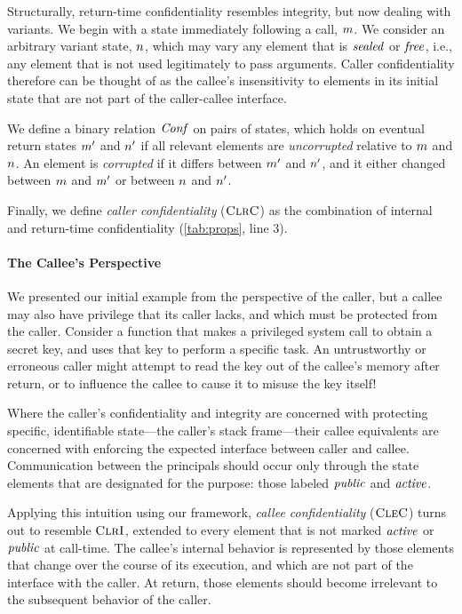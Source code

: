 \documentclass[10pt,conference]{ieeetran}%
\theoremstyle{definition}
\begin{document}
Structurally, return-time confidentiality resembles integrity, but now dealing with
variants. We begin with a state immediately following
a call, \(m\). We consider an arbitrary variant state,
\(n\), which may vary any element that is \(\mathit{sealed}\) or \(\mathit{free}\),
i.e., any element that is not used legitimately to pass arguments. Caller confidentiality
therefore can be thought of as the callee's insensitivity to elements in its initial state
that are not part of the caller-callee interface.

We define a binary relation \(\mathit{Conf}\) on pairs of states,
which holds on eventual return states \(m'\) and \(n'\)
if all relevant elements are {\em uncorrupted} relative to \(m\) and \(n\).
An element is {\em corrupted} if it differs between \(m'\) and \(n'\),
and it either changed between \(m\) and \(m'\) or between \(n\) and \(n'\).

Finally, we define \emph{caller confidentiality} (\(\textnormal{\sc ClrC}\)) as the
combination of internal and return-time confidentiality (\cref{tab:props}, line 3).

\paragraph*{The Callee's Perspective}

We presented our initial example from the perspective of the caller, but a callee
may also have privilege that its caller lacks, and which must be protected from the
caller. Consider a function that makes a privileged system call to obtain a secret key,
and uses that key to perform a specific task. An untrustworthy or erroneous caller might
attempt to read the key out of the callee's memory after return, or to influence the callee
to cause it to misuse the key itself!

Where the caller's confidentiality and integrity are concerned with protecting specific,
identifiable state---the caller's stack frame---their callee equivalents are concerned
with enforcing the expected interface between caller and callee. Communication between
the principals should occur only through the state elements that are designated for the
purpose: those labeled \(\mathit{public}\) and \(\mathit{active}\).

Applying this intuition using our framework, \emph{callee confidentiality} (\(\textnormal{\sc CleC}\))
turns out to resemble \(\textnormal{\sc ClrI}\), extended to every element that is not marked \(\mathit{active}\)
or \(\mathit{public}\) at call-time. The callee's internal behavior is represented by those
elements that change over the course of its execution, and which are not part of the
interface with the caller. At return, those elements should become irrelevant to the
subsequent behavior of the caller.
\end{document}
